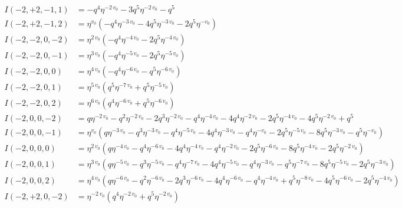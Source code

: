 \documentclass[11pt,a4paper]{article}
\begin{document}
\begin{align*}
I(-2, +2, -1, 1) &= -q^{4} \eta^{-2 \, v_{0}} - 3 q^{5} \eta^{-2 \, v_{0}} - q^{5} \\
I(-2, +2, -1, 2) &= \eta^{v_{0}} \left( -q^{4} \eta^{-3 \, v_{0}} - 4 q^{5} \eta^{-3 \, v_{0}} - 2 q^{5} \eta^{-v_{0}} \right) \\
I(-2, -2, 0, -2) &= \eta^{2 \, v_{0}} \left( -q^{4} \eta^{-4 \, v_{0}} - 2 q^{5} \eta^{-4 \, v_{0}} \right) \\
I(-2, -2, 0, -1) &= \eta^{3 \, v_{0}} \left( -q^{4} \eta^{-5 \, v_{0}} - 2 q^{5} \eta^{-5 \, v_{0}} \right) \\
I(-2, -2, 0, 0) &= \eta^{4 \, v_{0}} \left( -q^{4} \eta^{-6 \, v_{0}} - q^{5} \eta^{-6 \, v_{0}} \right) \\
I(-2, -2, 0, 1) &= \eta^{5 \, v_{0}} \left( q^{5} \eta^{-7 \, v_{0}} + q^{5} \eta^{-5 \, v_{0}} \right) \\
I(-2, -2, 0, 2) &= \eta^{6 \, v_{0}} \left( q^{4} \eta^{-6 \, v_{0}} + q^{5} \eta^{-6 \, v_{0}} \right) \\
I(-2, 0, 0, -2) &= q \eta^{-2 \, v_{0}} - q^{2} \eta^{-2 \, v_{0}} - 2 q^{3} \eta^{-2 \, v_{0}} - q^{4} \eta^{-4 \, v_{0}} - 4 q^{4} \eta^{-2 \, v_{0}} - 2 q^{5} \eta^{-4 \, v_{0}} - 4 q^{5} \eta^{-2 \, v_{0}} + q^{5} \\
I(-2, 0, 0, -1) &= \eta^{v_{0}} \left( q \eta^{-3 \, v_{0}} - q^{3} \eta^{-3 \, v_{0}} - q^{4} \eta^{-5 \, v_{0}} - 4 q^{4} \eta^{-3 \, v_{0}} - q^{4} \eta^{-v_{0}} - 2 q^{5} \eta^{-5 \, v_{0}} - 8 q^{5} \eta^{-3 \, v_{0}} - q^{5} \eta^{-v_{0}} \right) \\
I(-2, 0, 0, 0) &= \eta^{2 \, v_{0}} \left( q \eta^{-4 \, v_{0}} - q^{4} \eta^{-6 \, v_{0}} - 4 q^{4} \eta^{-4 \, v_{0}} - q^{4} \eta^{-2 \, v_{0}} - 2 q^{5} \eta^{-6 \, v_{0}} - 8 q^{5} \eta^{-4 \, v_{0}} - 2 q^{5} \eta^{-2 \, v_{0}} \right) \\
I(-2, 0, 0, 1) &= \eta^{3 \, v_{0}} \left( q \eta^{-5 \, v_{0}} - q^{3} \eta^{-5 \, v_{0}} - q^{4} \eta^{-7 \, v_{0}} - 4 q^{4} \eta^{-5 \, v_{0}} - q^{4} \eta^{-3 \, v_{0}} - q^{5} \eta^{-7 \, v_{0}} - 8 q^{5} \eta^{-5 \, v_{0}} - 2 q^{5} \eta^{-3 \, v_{0}} \right) \\
I(-2, 0, 0, 2) &= \eta^{4 \, v_{0}} \left( q \eta^{-6 \, v_{0}} - q^{2} \eta^{-6 \, v_{0}} - 2 q^{3} \eta^{-6 \, v_{0}} - 4 q^{4} \eta^{-6 \, v_{0}} - q^{4} \eta^{-4 \, v_{0}} + q^{5} \eta^{-8 \, v_{0}} - 4 q^{5} \eta^{-6 \, v_{0}} - 2 q^{5} \eta^{-4 \, v_{0}} \right) \\
I(-2, +2, 0, -2) &= \eta^{-2 \, v_{0}} \left( q^{4} \eta^{-2 \, v_{0}} + q^{5} \eta^{-2 \, v_{0}} \right) \\

\end{align*}
\end{document}
